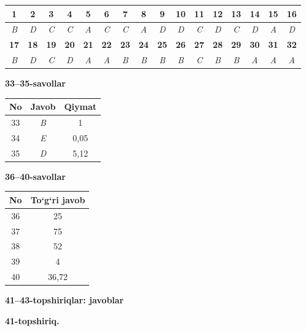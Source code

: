 \documentclass[11pt,a4paper]{article}
\begin{document}
\noindent\begin{tabular}{|c|c|c|c|c|c|c|c|c|c|c|c|c|c|c|c|}\hline
\textbf{1} & \textbf{2} & \textbf{3} & \textbf{4} & \textbf{5} & \textbf{6} & \textbf{7} & \textbf{8} & \textbf{9} & \textbf{10} & \textbf{11} & \textbf{12} & \textbf{13} & \textbf{14} & \textbf{15} & \textbf{16}\\\hline
\textsl{B} & \textsl{D} & \textsl{C} & \textsl{C} & \textsl{A} & \textsl{C} & \textsl{C} & \textsl{A} & \textsl{D} & \textsl{D} & \textsl{C} & \textsl{D} & \textsl{C} & \textsl{D} & \textsl{A} & \textsl{D}\\\hline
\textbf{17} & \textbf{18} & \textbf{19} & \textbf{20} & \textbf{21} & \textbf{22} & \textbf{23} & \textbf{24} & \textbf{25} & \textbf{26} & \textbf{27} & \textbf{28} & \textbf{29} & \textbf{30} & \textbf{31} & \textbf{32}\\\hline
\textsl{B} & \textsl{D} & \textsl{C} & \textsl{D} & \textsl{A} & \textsl{A} & \textsl{B} & \textsl{B} & \textsl{B} & \textsl{B} & \textsl{C} & \textsl{B} & \textsl{B} & \textsl{A} & \textsl{A} & \textsl{A}\\\hline
\end{tabular}\par\medskip
\noindent\textbf{33--35-savollar}\par\smallskip
\noindent\begin{tabular}{|c|c|c|}\hline \textbf{No} & \textbf{Javob} & \textbf{Qiymat}\\\hline
33 & \textsl{B} & 1\\\hline
34 & \textsl{E} & 0,05\\\hline
35 & \textsl{D} & 5,12\\\hline
\end{tabular}\par\medskip
\noindent\textbf{36--40-savollar}\par\smallskip
\noindent\begin{tabular}{|c|c|}\hline \textbf{No} & \textbf{To`g`ri javob}\\\hline
36 & 25\\\hline
37 & 75\\\hline
38 & 52\\\hline
39 & 4\\\hline
40 & 36,72\\\hline
\end{tabular}\par\medskip
\noindent\textbf{41--43-topshiriqlar: javoblar}\par\smallskip
\noindent\textbf{41-topshiriq.}\par
\end{document}
